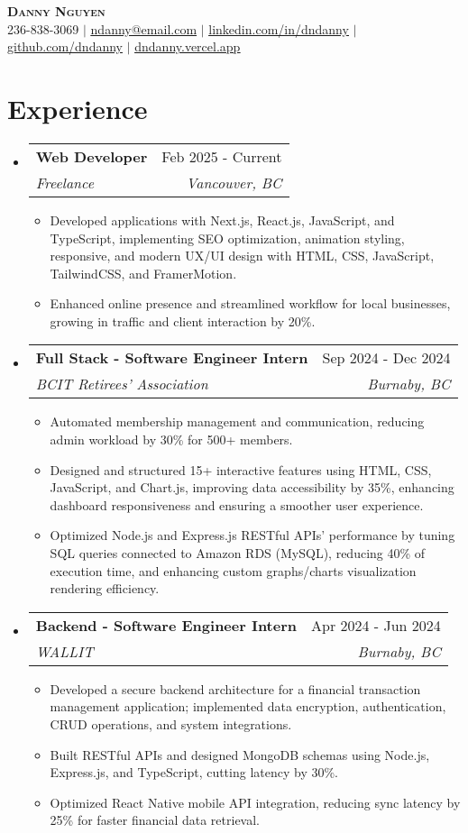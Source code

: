 \documentclass[letterpaper,11pt]{article}
\makeatletter
\newcommand{\resumeItem}[1]{
\item\small{
{#1 \vspace{-2pt}}
}
}
\newcommand{\resumeSubheading}[4]{
\vspace{-2pt}\item
\begin{tabular*}{0.97\textwidth}[t]{l@{\extracolsep{\fill}}r}
\textbf{#1} & #2 \\
\textit{\small#3} & \textit{\small #4} \\
\end{tabular*}\vspace{-7pt}
}
\newcommand{\resumeSubHeadingListStart}{\begin{itemize}[leftmargin=0.15in, label={}]}
\newcommand{\resumeSubHeadingListEnd}{\end{itemize}}
\newcommand{\resumeItemListStart}{\begin{itemize}}
\newcommand{\resumeItemListEnd}{\end{itemize}\vspace{-5pt}}
\makeatother
\begin{document}
\begin{center}
\textbf{\Huge \scshape Danny Nguyen} \\ \vspace{1pt}
\small 236-838-3069 $|$ \href{mailto:ndanny@email.com}{\underline{ndanny@email.com}} $|$
\href{https://linkedin.com/in/dndanny}{\underline{linkedin.com/in/dndanny}} $|$
\href{https://github.com/dndanny}{\underline{github.com/dndanny}} $|$ \href{https://dndanny.vercel.app}{\underline{dndanny.vercel.app}}
\end{center}


\section{Experience}
\resumeSubHeadingListStart
\resumeSubheading{Web Developer}{Feb 2025 - Current}{Freelance}{Vancouver, BC}
\resumeItemListStart
\resumeItem{Developed applications with Next.js, React.js, JavaScript, and TypeScript, implementing SEO optimization, animation styling, responsive, and modern UX/UI design with HTML, CSS, JavaScript, TailwindCSS, and FramerMotion.}
\resumeItem{Enhanced online presence and streamlined workflow for local businesses, growing in traffic and client interaction by 20\%.}
\resumeItemListEnd

\resumeSubheading{Full Stack - Software Engineer Intern}{Sep 2024 - Dec 2024}{BCIT Retirees' Association}{Burnaby, BC}
\resumeItemListStart
\resumeItem{Automated membership management and communication, reducing admin workload by 30\% for 500+ members.}
\resumeItem{Designed and structured 15+ interactive features using HTML, CSS, JavaScript, and Chart.js, improving data accessibility by 35\%, enhancing dashboard responsiveness and ensuring a smoother user experience.}
\resumeItem{Optimized Node.js and Express.js RESTful APIs' performance by tuning SQL queries connected to Amazon RDS (MySQL), reducing 40\% of execution time, and enhancing custom graphs/charts visualization rendering efficiency.}
\resumeItemListEnd

\resumeSubheading{Backend - Software Engineer Intern}{Apr 2024 - Jun 2024}{WALLIT}{Burnaby, BC}
\resumeItemListStart
\resumeItem{Developed a secure backend architecture for a financial transaction management application; implemented data encryption, authentication, CRUD operations, and system integrations.}
\resumeItem{Built RESTful APIs and designed MongoDB schemas using Node.js, Express.js, and TypeScript, cutting latency by 30\%.}
\resumeItem{Optimized React Native mobile API integration, reducing sync latency by 25\% for faster financial data retrieval.}
\resumeItemListEnd
\resumeSubHeadingListEnd
\end{document}
